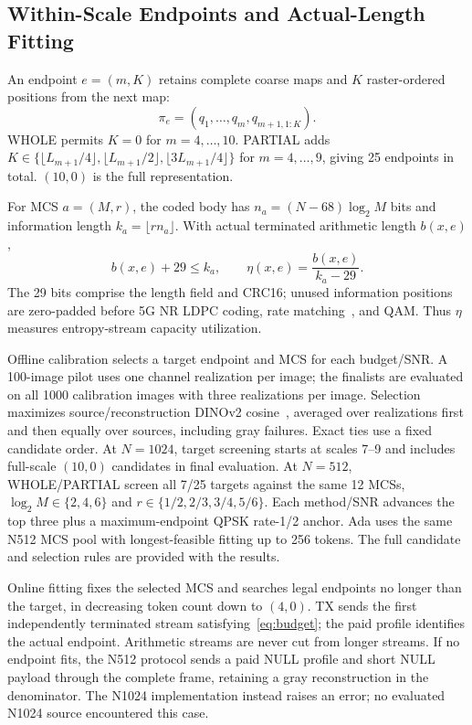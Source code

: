 \subsection{Within-Scale Endpoints and Actual-Length Fitting}
An endpoint $e=(m,K)$ retains complete coarse maps and $K$ raster-ordered positions from the next map:
\begin{equation}
 \pi_e=(q_1,\ldots,q_m,q_{m+1,1:K}).
 \label{eq:prefix}
\end{equation}
WHOLE permits $K=0$ for $m=4,\ldots,10$. PARTIAL adds
$K\in\{\lfloor L_{m+1}/4\rfloor,\allowbreak\lfloor L_{m+1}/2\rfloor,\allowbreak\lfloor3L_{m+1}/4\rfloor\}$ for $m=4,\ldots,9$, giving 25 endpoints in total. $(10,0)$ is the full representation.

For MCS $a=(M,r)$, the coded body has $n_a=(N-68)\log_2M$ bits and information length $k_a=\lfloor rn_a\rfloor$. With actual terminated arithmetic length $b(x,e)$,
\begin{equation}
 b(x,e)+29\leq k_a,\qquad \eta(x,e)=\frac{b(x,e)}{k_a-29}.
 \label{eq:budget}
\end{equation}
The 29 bits comprise the length field and CRC16; unused information positions are zero-padded before 5G NR LDPC coding, rate matching~\cite{nr}, and QAM. Thus $\eta$ measures entropy-stream capacity utilization.

Offline calibration selects a target endpoint and MCS for each budget/SNR. A 100-image pilot uses one channel realization per image; the finalists are evaluated on all 1000 calibration images with three realizations per image. Selection maximizes source/reconstruction DINOv2 cosine~\cite{dinov2}, averaged over realizations first and then equally over sources, including gray failures. Exact ties use a fixed candidate order. At $N=1024$, target screening starts at scales 7--9 and includes full-scale $(10,0)$ candidates in final evaluation. At $N=512$, WHOLE/PARTIAL screen all 7/25 targets against the same 12 MCSs, $\log_2M\in\{2,4,6\}$ and $r\in\{1/2,2/3,3/4,5/6\}$. Each method/SNR advances the top three plus a maximum-endpoint QPSK rate-1/2 anchor. Ada uses the same N512 MCS pool with longest-feasible fitting up to 256 tokens. The full candidate and selection rules are provided with the results.

Online fitting fixes the selected MCS and searches legal endpoints no longer than the target, in decreasing token count down to $(4,0)$. TX sends the first independently terminated stream satisfying~\eqref{eq:budget}; the paid profile identifies the actual endpoint. Arithmetic streams are never cut from longer streams. If no endpoint fits, the N512 protocol sends a paid NULL profile and short NULL payload through the complete frame, retaining a gray reconstruction in the denominator. The N1024 implementation instead raises an error; no evaluated N1024 source encountered this case.

